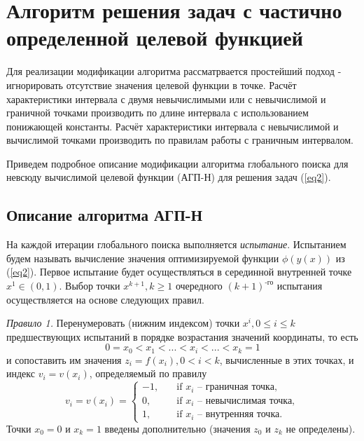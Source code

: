 \documentclass[10pt,a4paper]{book}
\begin{document}
\section{Алгоритм решения задач с частично определенной целевой функцией}\label{sec:algorithm}

Для реализации модификации алгоритма рассматрвается простейший подход - игнорировать отсутствие значения целевой функции в точке. Расчёт характеристики интервала с двумя невычислимыми или с невычислимой и граничной точками производить по длине интервала с использованием понижающей константы. Расчёт характеристики интервала с невычислимой и вычислимой точками производить по правилам работы с граничным интервалом.

Приведем подробное описание модификации алгоритма глобального поиска для невсюду вычислимой целевой функции (АГП-Н) для решения задач (\ref{eq2}).


\subsection{Описание алгоритма АГП-Н}

На каждой итерации глобального поиска выполняется \textit{испытание}. Испытанием будем называть вычисление значения оптимизируемой функции $\phi (y(x))$ из (\ref{eq2}). Первое испытание будет осуществляться в серединной внутренней точке $x^1 \in (0,1)$. Выбор точки $x^{k+1}, k \geq 1$ очередного $(k+1)^\text{-го}$ испытания осуществляется на основе следующих правил.

\textit{Правило 1.} Перенумеровать (нижним индексом) точки $x^i, 0 \leq i \leq k$ предшествующих испытаний в порядке возрастания значений координаты, то есть
\begin{equation}\label{eq5} 
0=x_0 < x_1 < ... < x_i < ... < x_{k}=1
\end{equation}
и сопоставить им значения $z_i=f(x_i), 0 < i < k$, вычисленные в этих точках, и индекс $v_i=v(x_i)$, определяемый по правилу
\begin{equation}\label{eq6} 
v_i=v(x_i)=
  \begin{cases}
    -1, & {\quad \text{if } x_i \text{ -- граничная точка}},\\
    0, & {\quad \text{if } x_i \text{ -- невычислимая точка}},\\
    1, & {\quad \text{if } x_i \text{ -- внутренняя точка}}.
  \end{cases}
\end{equation}
Точки $x_0=0$ и $x_{k}=1$ введены дополнительно (значения $z_0$ и $z_{k}$ не определены).
\end{document}
